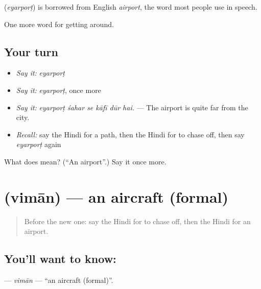 \begin{cousinweb}
\textbf{} (\emph{eyarporṭ}) is borrowed from English \emph{airport}, the word most people use in speech.
\end{cousinweb}

\begin{grammarlens}[title={What you've built}]
One more word for getting around.
\end{grammarlens}

\subsection*{Your turn}
\begin{itemize}
\raggedright
  \item \emph{Say it:} \emph{eyarporṭ}
  \item \emph{Say it:} \emph{eyarporṭ}, once more
  \item \emph{Say it:} \emph{eyarporṭ śahar se kāfī dūr hai.} — The airport is quite far from the city.
  \item \emph{Recall:} say the Hindi for a path, then the Hindi for to chase off, then say \emph{eyarporṭ} again
\end{itemize}

\begin{tcolorbox}[breakable,colback=teal!4,colframe=teal!35!black,title={Before you move on}]
What does  mean? (\textquotedblleft{}An airport\textquotedblright{}.) Say it once more.
\end{tcolorbox}
\section[\texorpdfstring{\hi{विमान} (vimān)}{विमान (vimān)}]{ (vimān) — an aircraft (formal)}

\label{lesson:HI-C409-viman}



\begin{quote}
Before the new one: say the Hindi for to chase off, then the Hindi for an airport.
\end{quote}

\subsection*{You'll want to know: }
\textbf{} — \emph{vimān} — \textquotedblleft{}an aircraft (formal)\textquotedblright{}.

\begin{quote}
      
\end{quote}

